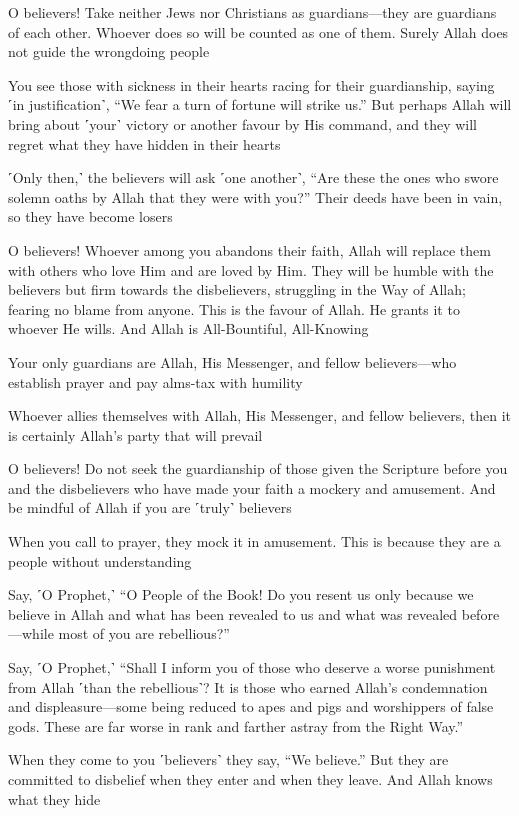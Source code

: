 O believers! Take neither Jews nor Christians as guardians—they are guardians of each other. Whoever does so will be counted as one of them. Surely Allah does not guide the wrongdoing people

You see those with sickness in their hearts racing for their guardianship, saying ˹in justification˺, “We fear a turn of fortune will strike us.” But perhaps Allah will bring about ˹your˺ victory or another favour by His command, and they will regret what they have hidden in their hearts

˹Only then,˺ the believers will ask ˹one another˺, “Are these the ones who swore solemn oaths by Allah that they were with you?” Their deeds have been in vain, so they have become losers

O believers! Whoever among you abandons their faith, Allah will replace them with others who love Him and are loved by Him. They will be humble with the believers but firm towards the disbelievers, struggling in the Way of Allah; fearing no blame from anyone. This is the favour of Allah. He grants it to whoever He wills. And Allah is All-Bountiful, All-Knowing

Your only guardians are Allah, His Messenger, and fellow believers—who establish prayer and pay alms-tax with humility

Whoever allies themselves with Allah, His Messenger, and fellow believers, then it is certainly Allah’s party that will prevail

O believers! Do not seek the guardianship of those given the Scripture before you and the disbelievers who have made your faith a mockery and amusement. And be mindful of Allah if you are ˹truly˺ believers

When you call to prayer, they mock it in amusement. This is because they are a people without understanding

Say, ˹O Prophet,˺ “O People of the Book! Do you resent us only because we believe in Allah and what has been revealed to us and what was revealed before—while most of you are rebellious?”

Say, ˹O Prophet,˺ “Shall I inform you of those who deserve a worse punishment from Allah ˹than the rebellious˺? It is those who earned Allah’s condemnation and displeasure—some being reduced to apes and pigs and worshippers of false gods. These are far worse in rank and farther astray from the Right Way.”

When they come to you ˹believers˺ they say, “We believe.” But they are committed to disbelief when they enter and when they leave. And Allah knows what they hide

